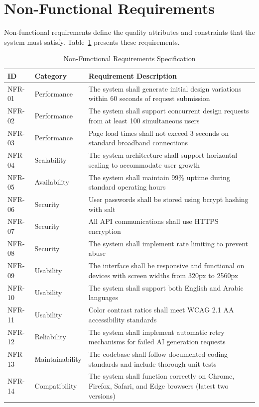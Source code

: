\section{Non-Functional Requirements}
\label{sec:nonfunctional_requirements}

Non-functional requirements define the quality attributes and constraints that the system must satisfy. Table~\ref{tab:nonfunctional_requirements} presents these requirements.

\begin{table}[htbp]
    \centering
    \caption{Non-Functional Requirements Specification}
    \label{tab:nonfunctional_requirements}
    \begin{tabularx}{\textwidth}{|p{1.5cm}|p{3.0cm}|X|}
        \hline
        \textbf{ID} & \textbf{Category} & \textbf{Requirement Description} \\
        \hline
        NFR-01 & Performance & The system shall generate initial design variations within 60 seconds of request submission \\
        \hline
        NFR-02 & Performance & The system shall support concurrent design requests from at least 100 simultaneous users \\
        \hline
        NFR-03 & Performance & Page load times shall not exceed 3 seconds on standard broadband connections \\
        \hline
        NFR-04 & Scalability & The system architecture shall support horizontal scaling to accommodate user growth \\
        \hline
        NFR-05 & Availability & The system shall maintain 99\% uptime during standard operating hours \\
        \hline
        NFR-06 & Security & User passwords shall be stored using bcrypt hashing with salt \\
        \hline
        NFR-07 & Security & All API communications shall use HTTPS encryption \\
        \hline
        NFR-08 & Security & The system shall implement rate limiting to prevent abuse \\
        \hline
        NFR-09 & Usability & The interface shall be responsive and functional on devices with screen widths from 320px to 2560px \\
        \hline
        NFR-10 & Usability & The system shall support both English and Arabic languages \\
        \hline
        NFR-11 & Usability & Color contrast ratios shall meet WCAG 2.1 AA accessibility standards \\
        \hline
        NFR-12 & Reliability & The system shall implement automatic retry mechanisms for failed AI generation requests \\
        \hline
        NFR-13 & Maintainability & The codebase shall follow documented coding standards and include thorough unit tests \\
        \hline
        NFR-14 & Compatibility & The system shall function correctly on Chrome, Firefox, Safari, and Edge browsers (latest two versions) \\
        \hline
    \end{tabularx}
\end{table}

